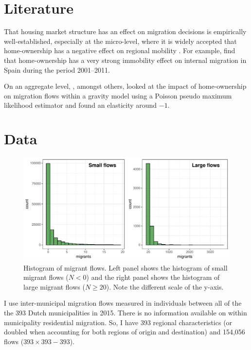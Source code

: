 \documentclass[12pt, parskip, abstracton,notitlepage]{scrartcl}
\begin{document}
\section{Literature}

That housing market structure has an effect on migration
decisions is empirically well-established, especially at the micro-level,
where it is widely accepted that home-ownership has a negative
effect on regional mobility \citep{dietz2003social}. For
example, \citet{palomares2018understanding} find that
home-ownership has a very strong immobility effect on
internal migration in Spain during the period 2001--2011.

On an aggregate level, \citet{amirault2016drags}, amongst others,
looked at the impact of home-ownership on migration flows
within a gravity model using a Poisson pseudo maximum
likelihood estimator and found an elasticity around
$-1$. 

\section{Data}

\begin{figure}[h!]\centering %
	\includegraphics[width=0.8\linewidth]{../fig/hist_mig.pdf}
	\caption{Histogram of migrant flows. Left panel shows the
		histogram of small migrant flows ($N<0$) and the right
		panel shows the histogram of large migrant flows
		($N \geq 20$). Note the different scale of the y-axis.}
	\label{fig:hist_mig}
\end{figure}


I use inter-municipal migration flows measured in individuals
between all of the the 393 Dutch municipalities in 2015. There
is no information available on within municipality residential
migration. So, I have 393 regional characteristics (or doubled
when accounting for both regions of origin and destination)
and 154,056 flows ($393 \times 393 - 393$).
\end{document}
